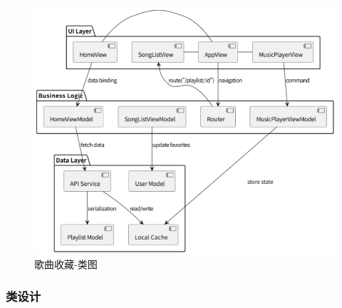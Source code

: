 \documentclass{base}
\begin{document}
\begin{figure}[H]
    \centering
    \includegraphics[width=\textwidth]{images/5-7.png}
    \caption{歌曲收藏-类图}
\end{figure}

\subsubsection{类设计}
\end{document}
